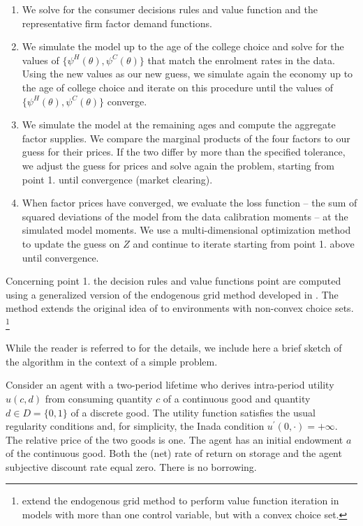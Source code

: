 \documentclass[a4paper,dvips,12pt]{article}
\begin{document}
\begin{enumerate}
\item We solve for the consumer decisions rules and value function and the
representative firm factor demand functions.

\item We simulate the model up to the age of the college choice and solve
for the values of $\{\psi^{H}(\theta),\psi^{C}(\theta)\}$ that match the
enrolment rates in the data. Using the new values as our new guess, we
simulate again the economy up to the age of college choice and iterate on
this procedure until the values of $\{\psi^{H}(\theta),\psi^{C}(\theta)\}$
converge.

\item We simulate the model at the remaining ages and compute the aggregate
factor supplies. We compare the marginal products of the four factors to
our guess for their prices. If the two differ by more than the specified
tolerance, we adjust the guess for prices and solve again the problem,
starting from point 1. until convergence (market clearing).

\item When factor prices have converged, we evaluate the loss function --
the sum of squared deviations of the model from the data calibration moments
-- at the simulated model moments. We use a multi-dimensional optimization
method to update the guess on $Z$ and continue to iterate starting from
point 1. above until convergence.
\end{enumerate}

Concerning point 1. the decision rules and value functions point are
computed using a generalized version of the endogenous grid method developed
in . The method extends the original idea of %
 to environments with non-convex choice sets.%
\footnote{ extend the endogenous grid
method to perform value function iteration in models with more than one
control variable, but with a convex choice set.}

While the reader is referred to  for the details, we
include here a brief sketch of the algorithm in the context of a simple
problem.

Consider an agent with a two-period lifetime who derives intra-period
utility $u(c,d)$ from consuming quantity $c$ of a continuous good and
quantity $d\in D=\{0,1\}$ of a discrete good. The utility function satisfies
the usual regularity conditions and, for simplicity, the Inada condition $%
u^{\prime }(0,\cdot)=+\infty.$ The relative price of the two goods is one.
The agent has an initial endowment $a$ of the continuous good. Both the
(net) rate of return on storage and the agent subjective discount rate equal
zero. There is no borrowing.
\end{document}
